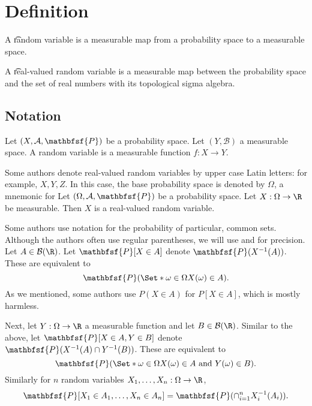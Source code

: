 
\section*{Definition}

A \t{random variable} is a measurable map from a probability space to a measurable space.

A \t{real-valued random variable} is a measurable map between the probability space and the set of real numbers with its topological sigma algebra.

\subsection*{Notation}

Let $(X, \mathcal{A} , \mathbfsf{P} )$ be a probability space.
Let $(Y, \mathcal{B} )$ a measurable space.
A random variable is a measurable function $f: X \to Y$.

Some authors denote real-valued random variables by upper case Latin letters: for example, $X, Y, Z$.
In this case, the base probability space is denoted by $\Omega $, a mnemonic for 
Let $(\Omega ,\mathcal{A} ,\mathbfsf{P} )$ be a probability space.
Let $X: \Omega  \to \R $ be measurable.
Then $X$ is a real-valued random variable.

Some authors use notation for the probability of particular, common sets.
Although the authors often use regular parentheses, we will use \say{$[$} and \say{$]$} for precision.
Let $A \in \mathcal{B} (\R )$.
Let $\mathbfsf{P} [X \in A]$ denote $\mathbfsf{P} (X^{-1}(A))$.
These are equivalent to
  \[
\mathbfsf{P} (\Set*{\omega  \in \Omega }{X(\omega ) \in A}).
  \]
As we mentioned, some authors use $P(X \in A)$ for $P[X \in A]$, which is mostly harmless.

Next, let $Y: \Omega  \to \R $ a measurable function and let $B \in \mathcal{B} (\R )$.
Similar to the above, let $\mathbfsf{P} [X \in A, Y \in B]$ denote $\mathbfsf{P} (X^{-1}(A) \cap  Y^{-1}(B))$.
These are equivalent to
  \[
\mathbfsf{P} (\Set*{\omega  \in \Omega }{X(\omega ) \in A \text{ and } Y(\omega ) \in B}).
  \]
Similarly for $n$ random variables $X_1, \dots , X_n: \Omega \to \R $,
  \[
\mathbfsf{P} [X_1 \in A_1, \dots , X_n \in A_n] = \mathbfsf{P} (\cap _{i = 1}^{n} X_i^{-1}(A_i)).
  \]

\blankpage